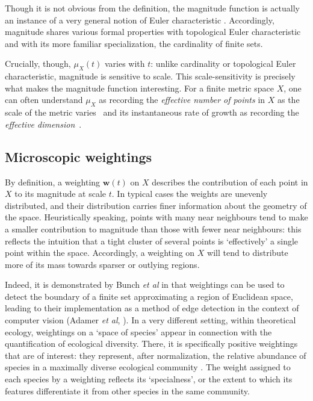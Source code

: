 \documentclass[a4paper, oneside, reqno]{amsart}
\theoremstyle{definition}
\theoremstyle{remark}
\numberwithin{equation}{section}
\renewcommand{\vec}{\mathbf}
\begin{document}
Though it is not obvious from the definition, the magnitude function is actually an instance of a very general notion of Euler characteristic \cite[\S 1.3]{LeinsterMagnitude2013}. Accordingly, magnitude shares various formal properties with topological Euler characteristic and with its more familiar specialization, the cardinality of finite sets. 

Crucially, though, \(\mu_X(t)\) varies with \(t\): unlike cardinality or topological Euler characteristic, magnitude is sensitive to scale. This scale-sensitivity is precisely what makes the magnitude function interesting. For a finite metric space \(X\), one can often understand \(\mu_X\) as recording the \emph{effective number of points} in \(X\) as the scale of the metric varies~\cite[Example~6.4.6]{LeinsterEntropy2021} and its instantaneous rate of growth as recording the \emph{effective dimension}~\cite[\S 4]{WillertonSpread2015}.


\subsection{Microscopic weightings}
\label{subsec:microweightings}

By definition, a weighting \(\vec{w}(t)\) on \(X\) describes the contribution of each point in \(X\) to its magnitude at scale \(t\). In typical cases the weights are unevenly distributed, and their distribution carries finer information about the geometry of the space. Heuristically speaking, points with many near neighbours tend to make a smaller contribution to magnitude than those with fewer near neighbours: this reflects the intuition that a tight cluster of several points is `effectively' a single point within the space. Accordingly, a weighting on \(X\) will tend to distribute more of its mass towards sparser or outlying regions.

Indeed, it is demonstrated by Bunch \textit{et al} in \cite{Bunch-etal} that weightings can be used to detect the boundary of a finite set approximating a region of Euclidean space, leading to their implementation as a method of edge detection in the context of computer vision (Adamer \textit{et al}, \cite{ABOR2019}). In a very different setting, within theoretical ecology, weightings on a `space of species' appear in connection with the quantification of ecological diversity. There, it is specifically positive weightings that are of interest: they represent, after normalization, the relative abundance of species in a maximally diverse ecological community  \cite{LeinsterMeckes2016, LeinsterRoff}. The weight assigned to each species by a weighting reflects its `specialness', or the extent to which its features differentiate it from other species in the same community.
\end{document}
